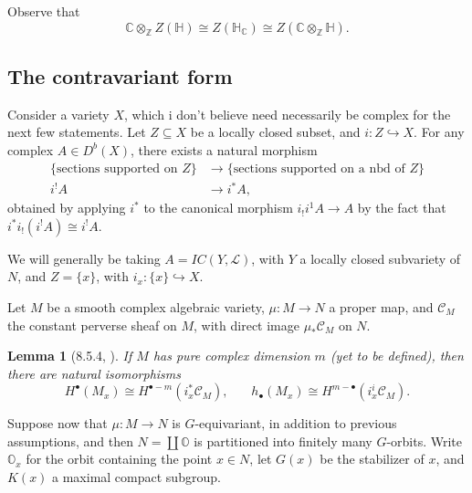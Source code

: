 \documentclass{memoir}
\newcommand{\mc}{\mathcal}
\newcommand{\mb}{\mathbb}
\newcommand{\bc}{\mathbb{C}}
\newcommand{\bz}{\mathbb{Z}}
\newcommand{\tx}{\text}
\newcommand{\ten}{\otimes}
\newtheorem{lemma}[theorem]{Lemma}
\theoremstyle{definition}
\begin{document}
	Observe that 
	$$\bc\ten_{\bz}Z(\mb{H})\cong Z(\mb{H}_\bc)\cong Z(\bc\ten_{\bz}\mb{H}).$$
	
	
	
	
	
	
	
	
	
	
	
	
	
	
	
	
	
	
	
	

	\subsection{The contravariant form}
	
	Consider a variety $X$, which i don't believe need necessarily be complex for the next few statements.  
	Let $Z\subseteq X$ be a locally closed subset, and $i:Z\hookrightarrow X$.
	For any complex $A\in D^b(X)$, there exists a natural morphism
	\begin{align*}
		\{\tx{sections supported on } Z\}&\to \{\tx{sections supported on a nbd of } Z\}\\
		i^!A&\to i^\ast A,
	\end{align*}
%
	obtained by applying $i^\ast$ to the canonical morphism $i_!i^1A\to A$ by the fact that $i^\ast i_!(i^!A)\cong i^!A$.
	
	We will generally be taking $A=IC(Y, \mc{L})$, with $Y$ a locally closed subvariety of $N$, and $Z=\{x\}$, with $i_x:\{x\}\hookrightarrow X$.  
	
	Let $M$ be a smooth complex algebraic variety, $\mu:M\to N$ a proper map, and $\mc{C}_M$ the constant perverse sheaf on $M$, with direct image $\mu_\ast\mc{C}_M$ on $N$.   
	
	\begin{lemma}[8.5.4, \cite{Chr}]
		If $M$ has pure complex dimension $m$ (yet to be defined), then there are natural isomorphisms
		$$H^\bullet(M_x)\cong H^{\bullet-m}(i_x^\ast\mc{C}_M), \ \ \ \ \ \ \ \ h_\bullet(M_x)\cong H^{m-\bullet}(i_x^i\mc{C}_M).$$
	\end{lemma}

	Suppose now that $\mu:M\to N$ is $G$-equivariant, in addition to previous assumptions, and then $N=\coprod \mb{O}$ is partitioned into finitely many $G$-orbits.  
	Write $\mb{O}_x$ for the orbit containing the point $x\in N$, let $G(x)$ be the stabilizer of $x$, and $K(x)$ a maximal compact subgroup. 
	
\end{document}
